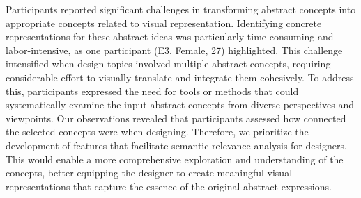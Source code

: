 Participants reported significant challenges in transforming abstract concepts into appropriate concepts related to visual representation.
Identifying concrete representations for these abstract ideas was particularly time-consuming and labor-intensive, as one participant (E3, Female, 27) highlighted.
This challenge intensified when design topics involved multiple abstract concepts, requiring considerable effort to visually translate and integrate them cohesively.
To address this, participants expressed the need for tools or methods that could systematically examine the input abstract concepts from diverse perspectives and viewpoints.
Our observations revealed that participants assessed how connected the selected concepts were when designing.
Therefore, we prioritize the development of features that facilitate semantic relevance analysis for designers.
This would enable a more comprehensive exploration and understanding of the concepts, better equipping the designer to create meaningful visual representations that capture the essence of the original abstract expressions.






